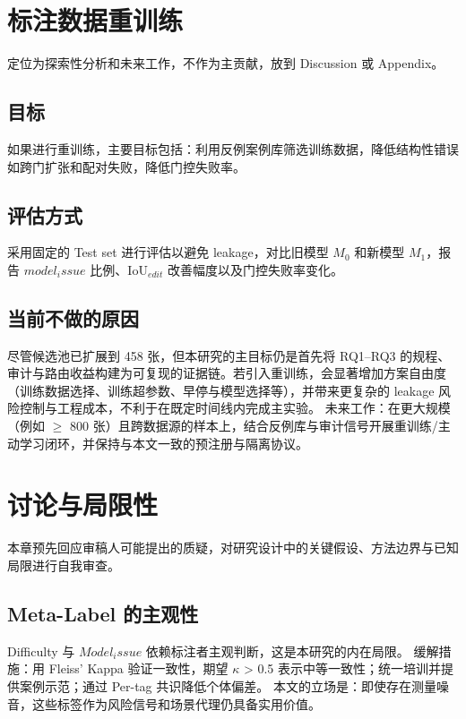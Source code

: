 \documentclass[journal,onecolumn]{IEEEtran}
\begin{document}
\section{标注数据重训练}
定位为探索性分析和未来工作，不作为主贡献，放到 Discussion 或 Appendix。
\subsection{目标}
如果进行重训练，主要目标包括：利用反例案例库筛选训练数据，降低结构性错误如跨门扩张和配对失败，降低门控失败率。
\subsection{评估方式}
采用固定的 Test set 进行评估以避免 leakage，对比旧模型 $M_{0}$ 和新模型 $M_{1}$，报告 $model_issue$ 比例、$\mathrm{IoU}_{edit}$ 改善幅度以及门控失败率变化。
\subsection{当前不做的原因}
尽管候选池已扩展到 458 张，但本研究的主目标仍是首先将 RQ1–RQ3 的规程、审计与路由收益构建为可复现的证据链。若引入重训练，会显著增加方案自由度（训练数据选择、训练超参数、早停与模型选择等），并带来更复杂的 leakage 风险控制与工程成本，不利于在既定时间线内完成主实验。
未来工作：在更大规模（例如 $\ge$ 800 张）且跨数据源的样本上，结合反例库与审计信号开展重训练/主动学习闭环，并保持与本文一致的预注册与隔离协议。

\section{讨论与局限性}

本章预先回应审稿人可能提出的质疑，对研究设计中的关键假设、方法边界与已知局限进行自我审查。
\subsection{Meta-Label 的主观性}

Difficulty 与 $Model_issue$ 依赖标注者主观判断，这是本研究的内在局限。
缓解措施：用 Fleiss' Kappa 验证一致性，期望 $\kappa$ > 0.5 表示中等一致性；统一培训并提供案例示范；通过 Per-tag 共识降低个体偏差。
本文的立场是：即使存在测量噪音，这些标签作为风险信号和场景代理仍具备实用价值。
\end{document}
